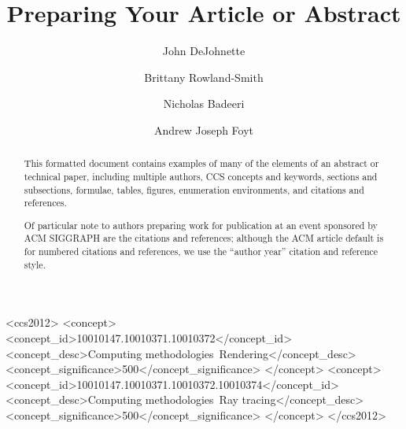 \documentclass[sigconf]{acmart}
\begin{document}
\title{Preparing Your Article or Abstract}

\author{John DeJohnette}

\author{Brittany Rowland-Smith}

\author{Nicholas Badeeri}

\author{Andrew Joseph Foyt}

\renewcommand{\shortauthors}{DeJohnette, Rowland-Smith, Badeeri, and Foyt}

\begin{abstract}
This formatted document contains examples of many of the elements of an abstract or technical paper, including multiple authors, CCS concepts and keywords, sections and subsections, formulae, tables, figures, enumeration environments, and citations and references. 

Of particular note to authors preparing work for publication at an event sponsored by ACM SIGGRAPH are the citations and references; although the ACM article default is for numbered citations and references, we use the ``author year'' citation and reference style.
\end{abstract}

\begin{CCSXML}
<ccs2012>
<concept>
<concept_id>10010147.10010371.10010372</concept_id>
<concept_desc>Computing methodologies~Rendering</concept_desc>
<concept_significance>500</concept_significance>
</concept>
<concept>
<concept_id>10010147.10010371.10010372.10010374</concept_id>
<concept_desc>Computing methodologies~Ray tracing</concept_desc>
<concept_significance>500</concept_significance>
</concept>
</ccs2012>
\end{CCSXML}


\end{document}
